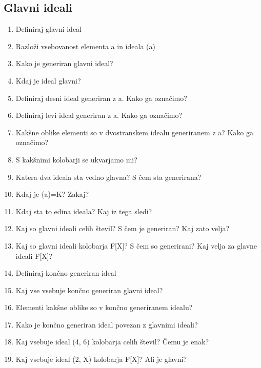 \documentclass{article}
\begin{document}
    \subsection{Glavni ideali}
    \begin{enumerate}
        \item Definiraj glavni ideal
        \item Razloži vsebovanost elementa a in ideala (a)
        \item Kako je generiran glavni ideal?
        \item Kdaj je ideal glavni?
        \item Definiraj desni ideal generiran z a. Kako ga označimo?
        \item Definiraj levi ideal generiran z a. Kako ga označimo?
        \item Kakšne oblike elementi so v dvostranskem idealu generiranem z a? Kako ga označimo?
        \item S kakšnimi kolobarji se ukvarjamo mi?
        \item Katera dva ideala sta vedno glavna? S čem sta generirana?
        \item Kdaj je (a)=K? Zakaj?
        \item Kdaj sta to edina ideala? Kaj iz tega sledi?
        \item Kaj so glavni ideali celih števil? S čem je generiran? Kaj zato velja?
        \item Kaj so glavni ideali kolobarja F[X]? S čem so generirani? Kaj velja za glavne ideali F[X]?
        \item Definiraj končno generiran ideal
        \item Kaj vse vsebuje končno generiran glavni ideal?
        \item Elementi kakšne oblike so v končno generiranem idealu?
        \item Kako je končno generiran ideal povezan z glavnimi ideali?
        \item Kaj vsebuje ideal (4, 6) kolobarja celih števil? Čemu je enak?
        \item Kaj vsebuje ideal (2, X) kolobarja F[X]? Ali je glavni?
    \end{enumerate}
\end{document}
